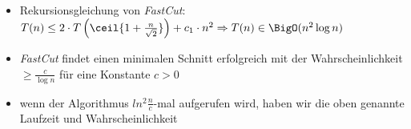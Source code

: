 \begin{itemize}
		\begin{itemize}
			\item Rekursionsgleichung von \textit{FastCut}: $T(n)\leq 2\cdot T\left(\ceil{1+\frac{n}{\sqrt{2}}}\right)+c_1\cdot n^2\\
			\Rightarrow T(n)\in \BigO(n^2\log n)$
			\item \textit{FastCut} findet einen minimalen Schnitt erfolgreich mit der Wahrscheinlichkeit $\geq \frac{c}{\log n}$ für eine Konstante $c>0$
			\item wenn der Algorithmus $ln^2 \frac{n}{c}$-mal aufgerufen wird, haben wir die oben genannte Laufzeit und Wahrscheinlichkeit
		\end{itemize}
\end{itemize}